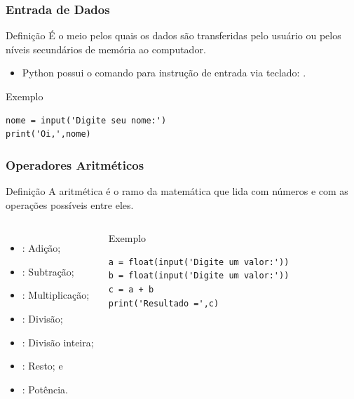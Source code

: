 \documentclass[aspectratio=169]{beamer} %
\begin{document}
\begin{frame}[fragile]
\frametitle{Entrada de Dados}

\begin{block}{Definição}
É o meio pelos quais os dados são transferidas pelo usuário ou pelos níveis secundários de memória ao computador.
\end{block}\vfill

\begin{itemize}
	\item Python possui o comando para instrução de entrada via teclado: .
\end{itemize}\vfill

\begin{exampleblock}{Exemplo}
	\begin{lstlisting}
nome = input('Digite seu nome:')
print('Oi,',nome)
	\end{lstlisting}
\end{exampleblock}
\end{frame}

\begin{frame}[fragile]
\frametitle{Operadores Aritméticos}

\begin{block}{Definição}
A aritmética é o ramo da matemática que lida com números e com as operações possíveis entre eles.
\end{block} \vfill

 \begin{columns}[c]


\begin{itemize}
	\item \structure{+} : Adição;
	\item \structure{-} : Subtração;
	\item \structure{*} : Multiplicação;
	\item \structure{/}  : Divisão;
	\item \structure{//}  : Divisão inteira;
	\item \structure{\%} : Resto; e
	\item \structure{**} : Potência.
\end{itemize}\vfill

\begin{exampleblock}{Exemplo}
	\begin{lstlisting}
a = float(input('Digite um valor:'))
b = float(input('Digite um valor:'))
c = a + b
print('Resultado =',c)
	\end{lstlisting}
\end{exampleblock}
\end{columns}
\end{frame}
\end{document}

